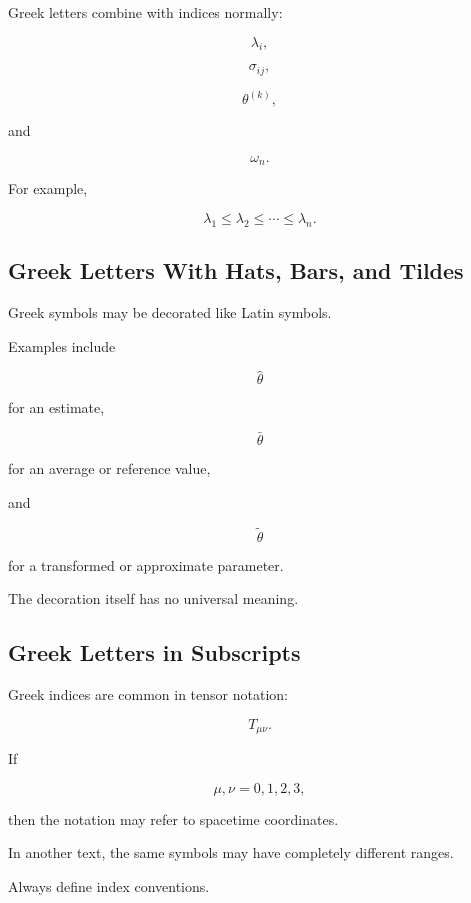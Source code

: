 Greek letters combine with indices normally:

\[
\boxed{
\lambda_i,
}
\]

\[
\boxed{
\sigma_{ij},
}
\]

\[
\boxed{
\theta^{(k)},
}
\]

and

\[
\boxed{
\omega_n.
}
\]

For example,

\[
\boxed{
\lambda_1\leq\lambda_2\leq\cdots\leq\lambda_n.
}
\]

\subsection{Greek Letters With Hats, Bars, and Tildes}
\label{subsec:decorated-greek-letters}

Greek symbols may be decorated like Latin symbols.

Examples include

\[
\boxed{
\hat{\theta}
}
\]

for an estimate,

\[
\boxed{
\bar{\theta}
}
\]

for an average or reference value,

and

\[
\boxed{
\tilde{\theta}
}
\]

for a transformed or approximate parameter.

The decoration itself has no universal meaning.

\subsection{Greek Letters in Subscripts}
\label{subsec:greek-in-subscripts}

Greek indices are common in tensor notation:

\[
\boxed{
T_{\mu\nu}.
}
\]

If

\[
\mu,\nu
=
0,1,2,3,
\]

then the notation may refer to spacetime coordinates.

In another text, the same symbols may have completely different ranges.

Always define index conventions.

